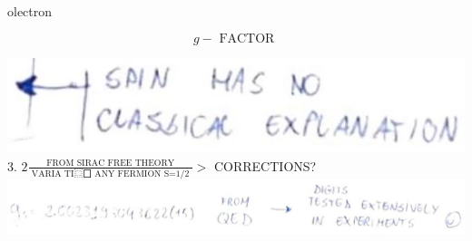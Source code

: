 \documentclass[10pt]{article}
\begin{document}
olectron

$$
g-\text { FACTOR }
$$

\includegraphics[max width=\textwidth, center]{2025_10_16_e34e240cf6beac2f9e0dg-2(3)}\\
3. $2 \frac{\text { FROM SIRAC FREE THEORY }}{\text { VARIA TI⿴囗 ANY FERMION S=1/2 }}>$ CORRECTIONS?\\
\includegraphics[max width=\textwidth, center]{2025_10_16_e34e240cf6beac2f9e0dg-2(4)}
\end{document}
